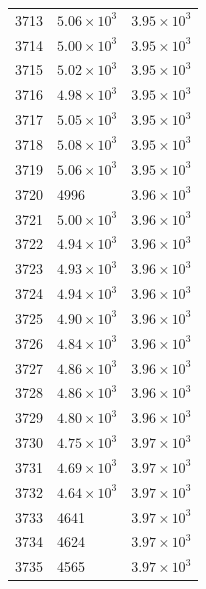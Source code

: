 \begin{table}[H]
\begin{tabular}{lll}
3713 & $\displaystyle 5.06 \times 10^{3}$ & $\displaystyle 3.95 \times 10^{3}$ \\
3714 & $\displaystyle 5.00 \times 10^{3}$ & $\displaystyle 3.95 \times 10^{3}$ \\
3715 & $\displaystyle 5.02 \times 10^{3}$ & $\displaystyle 3.95 \times 10^{3}$ \\
3716 & $\displaystyle 4.98 \times 10^{3}$ & $\displaystyle 3.95 \times 10^{3}$ \\
3717 & $\displaystyle 5.05 \times 10^{3}$ & $\displaystyle 3.95 \times 10^{3}$ \\
3718 & $\displaystyle 5.08 \times 10^{3}$ & $\displaystyle 3.95 \times 10^{3}$ \\
3719 & $\displaystyle 5.06 \times 10^{3}$ & $\displaystyle 3.95 \times 10^{3}$ \\
3720 & 4996 & $\displaystyle 3.96 \times 10^{3}$ \\
3721 & $\displaystyle 5.00 \times 10^{3}$ & $\displaystyle 3.96 \times 10^{3}$ \\
3722 & $\displaystyle 4.94 \times 10^{3}$ & $\displaystyle 3.96 \times 10^{3}$ \\
3723 & $\displaystyle 4.93 \times 10^{3}$ & $\displaystyle 3.96 \times 10^{3}$ \\
3724 & $\displaystyle 4.94 \times 10^{3}$ & $\displaystyle 3.96 \times 10^{3}$ \\
3725 & $\displaystyle 4.90 \times 10^{3}$ & $\displaystyle 3.96 \times 10^{3}$ \\
3726 & $\displaystyle 4.84 \times 10^{3}$ & $\displaystyle 3.96 \times 10^{3}$ \\
3727 & $\displaystyle 4.86 \times 10^{3}$ & $\displaystyle 3.96 \times 10^{3}$ \\
3728 & $\displaystyle 4.86 \times 10^{3}$ & $\displaystyle 3.96 \times 10^{3}$ \\
3729 & $\displaystyle 4.80 \times 10^{3}$ & $\displaystyle 3.96 \times 10^{3}$ \\
3730 & $\displaystyle 4.75 \times 10^{3}$ & $\displaystyle 3.97 \times 10^{3}$ \\
3731 & $\displaystyle 4.69 \times 10^{3}$ & $\displaystyle 3.97 \times 10^{3}$ \\
3732 & $\displaystyle 4.64 \times 10^{3}$ & $\displaystyle 3.97 \times 10^{3}$ \\
3733 & 4641 & $\displaystyle 3.97 \times 10^{3}$ \\
3734 & 4624 & $\displaystyle 3.97 \times 10^{3}$ \\
3735 & 4565 & $\displaystyle 3.97 \times 10^{3}$ \\

\end{tabular}
\end{table}

